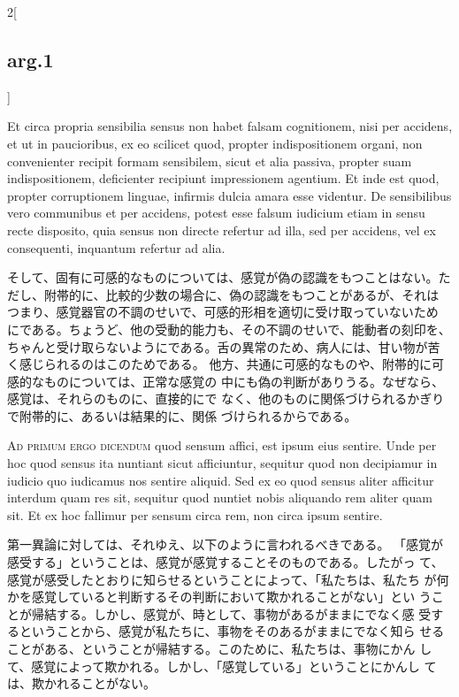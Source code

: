 \documentclass[paper=a4paper,fontsize=10pt,jafontsize=9pt,titlepage]{jlreq}
\begin{document}
\begin{paracol}{2}[\subsection{arg.1}]
\switchcolumn*


Et circa propria sensibilia sensus
non habet falsam cognitionem, nisi per accidens, et ut in paucioribus,
ex eo scilicet quod, propter indispositionem organi, non convenienter
recipit formam sensibilem, sicut et alia passiva, propter suam
indispositionem, deficienter recipiunt impressionem agentium. Et inde
est quod, propter corruptionem linguae, infirmis dulcia amara esse
videntur. De sensibilibus vero communibus et per accidens, potest esse
falsum iudicium etiam in sensu recte disposito, quia sensus non directe
refertur ad illa, sed per accidens, vel ex consequenti, inquantum
refertur ad alia.

\switchcolumn

そして、固有に可感的なものについては、感覚が偽の認識をもつことはない。た
 だし、附帯的に、比較的少数の場合に、偽の認識をもつことがあるが、それは
 つまり、感覚器官の不調のせいで、可感的形相を適切に受け取っていないため
 にである。ちょうど、他の受動的能力も、その不調のせいで、能動者の刻印を、
 ちゃんと受け取らないようにである。舌の異常のため、病人には、甘い物が苦
 く感じられるのはこのためである。
他方、共通に可感的なものや、附帯的に可感的なものについては、正常な感覚の
 中にも偽の判断がありうる。なぜなら、感覚は、それらのものに、直接的にで
 なく、他のものに関係づけられるかぎりで附帯的に、あるいは結果的に、関係
 づけられるからである。

\switchcolumn*[\subsection{ad.1}]


{\scshape Ad primum ergo dicendum} quod sensum affici, est ipsum eius
sentire. Unde per hoc quod sensus ita nuntiant sicut afficiuntur,
sequitur quod non decipiamur in iudicio quo iudicamus nos sentire
aliquid. Sed ex eo quod sensus aliter afficitur interdum quam res sit,
sequitur quod nuntiet nobis aliquando rem aliter quam sit. Et ex hoc
fallimur per sensum circa rem, non circa ipsum sentire.

\switchcolumn

第一異論に対しては、それゆえ、以下のように言われるべきである。
「感覚が感受する」ということは、感覚が感覚することそのものである。したがっ
 て、感覚が感受したとおりに知らせるということによって、「私たちは、私たち
 が何かを感覚していると判断するその判断において欺かれることがない」とい
 うことが帰結する。しかし、感覚が、時として、事物があるがままにでなく感
 受するということから、感覚が私たちに、事物をそのあるがままにでなく知ら
 せることがある、ということが帰結する。このために、私たちは、事物にかん
 して、感覚によって欺かれる。しかし、「感覚している」ということにかんし
 ては、欺かれることがない。


\end{paracol}
\end{document}
